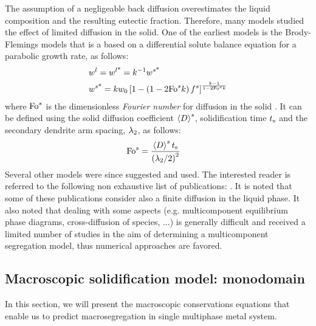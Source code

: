 The assumption of a negligeable back diffusion overestimates the liquid composition
and the resulting eutectic fraction. Therefore, many models studied the effect of limited diffusion in the solid. 
One of the earliest models is the Brody-Flemings models \citep{brody_solute_1966} that is a based on a differential solute balance equation for a parabolic growth rate, as follows:
\begin{align}
\label{eq:brodyflemings}
& {w}^l= {w}^{l \text{*}}  = k^{-1}  {w}^{s \text{*}}  \\
& {w}^{s \text{*}} = k {w}_0 \left[  1 - \left(  1 - 2 \text{Fo}^s k  \right) {f^s}  \right]^{\frac{k-1}{1 - 2 \text{Fo}^s k }}
\end{align}
where $\text{Fo}^s$ is the dimensionless \emph{Fourier number} for diffusion in the solid \citep{dantzig_solidification_2009}. 
It can be defined using the solid diffusion coefficient $\left \langle D \right \rangle^s$, solidification time $t_\text{s}$ and the secondary 
dendrite arm spacing, ${\lambda}_{2}$, as follows: 
\begin{align}
\label{eq:fouriersolid}
& \text{Fo}^s = \frac{\left \langle D \right \rangle^s t_\text{s}}{\left( {\lambda}_{2} / 2 \right)^2}
\end{align}
Several other models were since suggested and used. The interested reader is referred to the following non 
exhaustive list of publications: \citet{clyne_solute_1981,kobayashi_solute_1988,ni_volume-averaged_1991,wang_multiphase_1993,
combeau_modeling_1996,martorano_solutal_2003,tourret_generalized_2009}. It is noted that some of these publications consider 
also a finite diffusion in the liquid phase. It also noted that dealing with some aspects 
(e.g. multicomponent equilibrium phase diagrams, cross-diffusion of species, ...) is generally difficult
and received a limited number of studies in the aim of determining a multicomponent segregation model, thus numerical approaches are favored.

\subsection{Macroscopic solidification model: monodomain} \label{sec:monodomain}
In this section, we will present the macroscopic conservations equations that enable us to predict 
macrosegregation in single multiphase metal system.

 
